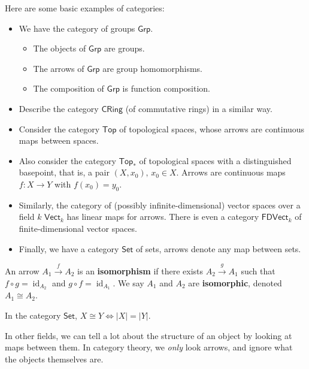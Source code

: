 \begin{example}
    Here are some basic examples of categories:
    \begin{itemize}
        \item We have the category of groups $\mathsf{Grp}.$ 
            \begin{itemize}
                \item The objects of $\mathsf{Grp}$ are groups.
                \item The arrows of $\mathsf{Grp}$ are group homomorphisms.
                \item The composition of $\mathsf{Grp}$ is function composition.
            \end{itemize}
        \item Describe the category $\mathsf{CRing}$ (of commutative rings) in a similar way.
        \item Consider the category $\mathsf{Top}$ of topological spaces, whose arrows are continuous maps between spaces.
        \item Also consider the category $\mathsf{Top}_{*}$ of topological spaces with a distinguished basepoint, that is, a pair $(X,x_0), \, x_0\in X$. Arrows are continuous maps $f \colon X \to Y$ with $f(x_0)=y_0$.
        \item Similarly, the category of (possibly infinite-dimensional) vector spaces over a field $k$ $\mathsf{Vect}_{k}$ has linear maps for arrows. There is even a category $\mathsf{FDVect}_{k}$ of finite-dimensional vector spaces.
        \item Finally, we have a category $\mathsf{Set}$ of sets, arrows denote any map between sets.
    \end{itemize}
\end{example}
\begin{definition}[Isomorphism]
    An arrow $A_1\overset{f}{\to }A_2$ is an \textbf{isomorphism} if there exists $A_2\overset{g}{\to }A_1$ such that $f\circ g=\operatorname{id}_{A_2}$ and $g\circ f=\operatorname{id}_{A_1}$. We say $A_1$ and $A_2$ are \textbf{isomorphic}, denoted $A_1\cong A_2$.
\end{definition}
\begin{remark}
    In the category $\mathsf{Set}$, $X\cong Y \iff |X|=|Y|$.
\end{remark}
In other fields, we can tell a lot about the structure of an object by looking at maps between them. In category theory, we \emph{only} look arrows, and ignore what the objects themselves are.
